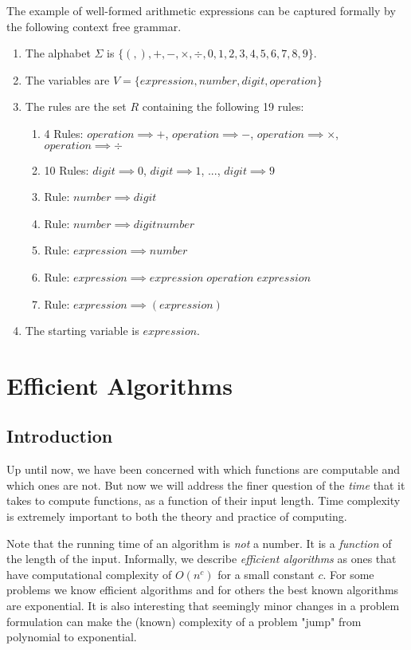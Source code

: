 \documentclass[a4paper, 12pt]{report}
\theoremstyle{remark}
\theoremstyle{definition}
\begin{document}
\begin{example}
The example of well-formed arithmetic expressions can be captured formally by the following context free grammar. 
\begin{enumerate}
    \item The alphabet $\Sigma$ is $\{(, ), +, -, \times, \div, 0, 1, 2, 3, 4, 5, 6, 7, 8, 9\}$. 
    \item The variables are $V = \{expression, number, digit, operation\}$
    \item The rules are the set $R$ containing the following 19 rules: 
    \begin{enumerate}
        \item 4 Rules: $operation \implies +$, $operation \implies -$, $operation \implies \times$, $operation \implies \div$
        \item 10 Rules: $digit \implies 0$, $digit \implies 1$, ..., $digit \implies 9$
        \item Rule: $number \implies digit$
        \item Rule: $number \implies digit number$
        \item Rule: $expression \implies number$
        \item Rule: $expression \implies expression\; operation\; expression$
        \item Rule: $expression \implies (expression)$
    \end{enumerate}
    \item The starting variable is $expression$.
\end{enumerate}
\end{example}

\chapter{Efficient Algorithms}

\section{Introduction}
Up until now, we have been concerned with which functions are computable and which ones are not. But now we will address the finer question of the \textit{time} that it takes to compute functions, as a function of their input length. Time complexity is extremely important to both the theory and practice of computing. 

Note that the running time of an algorithm is \textit{not} a number. It is a \textit{function} of the length of the input. Informally, we describe \textit{efficient algorithms} as ones that have computational complexity of $O(n^c)$ for a small constant $c$. For some problems we know efficient algorithms and for others the best known algorithms are exponential. It is also interesting that seemingly minor changes in a problem formulation can make the (known) complexity of a problem "jump" from polynomial to exponential. 
\end{document}
